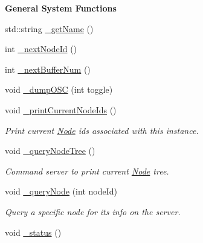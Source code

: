 \begin{Indent}{\bf General System Functions}\par
\begin{DoxyCompactItemize}
\item 
std\-::string \hyperlink{classColliderPlusPlus_1_1Client__Server_af9261516f282efbab896bff53ee52095}{\-\_\-get\-Name} ()
\item 
int \hyperlink{classColliderPlusPlus_1_1Client__Server_a4c45d5eb7b6bef9dd50c6376f3752d3e}{\-\_\-next\-Node\-Id} ()
\item 
int \hyperlink{classColliderPlusPlus_1_1Client__Server_af8224413e4b5bb059ba8b6165459dd7d}{\-\_\-next\-Buffer\-Num} ()
\item 
void \hyperlink{classColliderPlusPlus_1_1Client__Server_ae0fb9a18089043723fff0b11b57446ad}{\-\_\-dump\-O\-S\-C} (int toggle)
\item 
\hypertarget{classColliderPlusPlus_1_1Client__Server_a7d4511e809e49a26725750a8d3d859aa}{void \hyperlink{classColliderPlusPlus_1_1Client__Server_a7d4511e809e49a26725750a8d3d859aa}{\-\_\-print\-Current\-Node\-Ids} ()}\label{classColliderPlusPlus_1_1Client__Server_a7d4511e809e49a26725750a8d3d859aa}

\begin{DoxyCompactList}\small\item\em Print current \hyperlink{classColliderPlusPlus_1_1Node}{Node} ids associated with this instance. \end{DoxyCompactList}\item 
\hypertarget{classColliderPlusPlus_1_1Client__Server_a89364c9a2410454377434ee3eb2446ed}{void \hyperlink{classColliderPlusPlus_1_1Client__Server_a89364c9a2410454377434ee3eb2446ed}{\-\_\-query\-Node\-Tree} ()}\label{classColliderPlusPlus_1_1Client__Server_a89364c9a2410454377434ee3eb2446ed}

\begin{DoxyCompactList}\small\item\em Command server to print current \hyperlink{classColliderPlusPlus_1_1Node}{Node} tree. \end{DoxyCompactList}\item 
\hypertarget{classColliderPlusPlus_1_1Client__Server_a990e5c77c2579445279baa2f2850bf62}{void \hyperlink{classColliderPlusPlus_1_1Client__Server_a990e5c77c2579445279baa2f2850bf62}{\-\_\-query\-Node} (int node\-Id)}\label{classColliderPlusPlus_1_1Client__Server_a990e5c77c2579445279baa2f2850bf62}

\begin{DoxyCompactList}\small\item\em Query a specific node for its info on the server. \end{DoxyCompactList}\item 
\hypertarget{classColliderPlusPlus_1_1Client__Server_aac2f57518188e9c3fd9bede4c6bf7a6b}{void \hyperlink{classColliderPlusPlus_1_1Client__Server_aac2f57518188e9c3fd9bede4c6bf7a6b}{\-\_\-status} ()}\label{classColliderPlusPlus_1_1Client__Server_aac2f57518188e9c3fd9bede4c6bf7a6b}


\end{DoxyCompactItemize}
\end{Indent}
